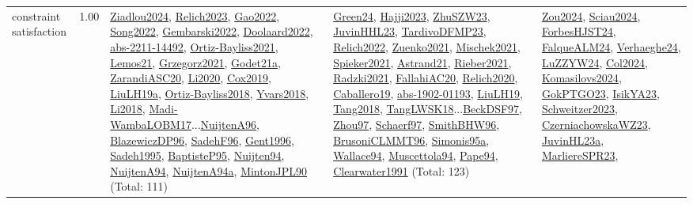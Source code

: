 {\begin{longtable}{p{3cm}r>{\raggedright\arraybackslash}p{6cm}>{\raggedright\arraybackslash}p{6cm}>{\raggedright\arraybackslash}p{8cm}}
\index{constraint satisfaction}\index{CP!constraint satisfaction}constraint satisfaction &  1.00 & \hyperref[detail:Ziadlou2024]{Ziadlou2024}, \hyperref[detail:Relich2023]{Relich2023}, \hyperref[detail:Gao2022]{Gao2022}, \hyperref[detail:Song2022]{Song2022}, \hyperref[detail:Gembarski2022]{Gembarski2022}, \hyperref[detail:Doolaard2022]{Doolaard2022}, \hyperref[detail:abs-2211-14492]{abs-2211-14492}, \hyperref[detail:Ortiz-Bayliss2021]{Ortiz-Bayliss2021}, \hyperref[detail:Lemos21]{Lemos21}, \hyperref[detail:Grzegorz2021]{Grzegorz2021}, \hyperref[detail:Godet21a]{Godet21a}, \hyperref[detail:ZarandiASC20]{ZarandiASC20}, \hyperref[detail:Li2020]{Li2020}, \hyperref[detail:Cox2019]{Cox2019}, \hyperref[detail:LiuLH19a]{LiuLH19a}, \hyperref[detail:Ortiz-Bayliss2018]{Ortiz-Bayliss2018}, \hyperref[detail:Yvars2018]{Yvars2018}, \hyperref[detail:Li2018]{Li2018}, \hyperref[detail:Madi-WambaLOBM17]{Madi-WambaLOBM17}...\hyperref[detail:NuijtenA96]{NuijtenA96}, \hyperref[detail:BlazewiczDP96]{BlazewiczDP96}, \hyperref[detail:SadehF96]{SadehF96}, \hyperref[detail:Gent1996]{Gent1996}, \hyperref[detail:Sadeh1995]{Sadeh1995}, \hyperref[detail:BaptisteP95]{BaptisteP95}, \hyperref[detail:Nuijten94]{Nuijten94}, \hyperref[detail:NuijtenA94]{NuijtenA94}, \hyperref[detail:NuijtenA94a]{NuijtenA94a}, \hyperref[detail:MintonJPL90]{MintonJPL90} (Total: 111) & \hyperref[detail:Green24]{Green24}, \hyperref[detail:Hajji2023]{Hajji2023}, \hyperref[detail:ZhuSZW23]{ZhuSZW23}, \hyperref[detail:JuvinHHL23]{JuvinHHL23}, \hyperref[detail:TardivoDFMP23]{TardivoDFMP23}, \hyperref[detail:Relich2022]{Relich2022}, \hyperref[detail:Zuenko2021]{Zuenko2021}, \hyperref[detail:Mischek2021]{Mischek2021}, \hyperref[detail:Spieker2021]{Spieker2021}, \hyperref[detail:Astrand21]{Astrand21}, \hyperref[detail:Rieber2021]{Rieber2021}, \hyperref[detail:Radzki2021]{Radzki2021}, \hyperref[detail:FallahiAC20]{FallahiAC20}, \hyperref[detail:Relich2020]{Relich2020}, \hyperref[detail:Caballero19]{Caballero19}, \hyperref[detail:abs-1902-01193]{abs-1902-01193}, \hyperref[detail:LiuLH19]{LiuLH19}, \hyperref[detail:Tang2018]{Tang2018}, \hyperref[detail:TangLWSK18]{TangLWSK18}...\hyperref[detail:BeckDSF97]{BeckDSF97}, \hyperref[detail:Zhou97]{Zhou97}, \hyperref[detail:Schaerf97]{Schaerf97}, \hyperref[detail:SmithBHW96]{SmithBHW96}, \hyperref[detail:BrusoniCLMMT96]{BrusoniCLMMT96}, \hyperref[detail:Simonis95a]{Simonis95a}, \hyperref[detail:Wallace94]{Wallace94}, \hyperref[detail:Muscettola94]{Muscettola94}, \hyperref[detail:Pape94]{Pape94}, \hyperref[detail:Clearwater1991]{Clearwater1991} (Total: 123) & \hyperref[detail:Zou2024]{Zou2024}, \hyperref[detail:Sciau2024]{Sciau2024}, \hyperref[detail:ForbesHJST24]{ForbesHJST24}, \hyperref[detail:FalqueALM24]{FalqueALM24}, \hyperref[detail:Verhaeghe24]{Verhaeghe24}, \hyperref[detail:LuZZYW24]{LuZZYW24}, \hyperref[detail:Col2024]{Col2024}, \hyperref[detail:Komasilovs2024]{Komasilovs2024}, \hyperref[detail:GokPTGO23]{GokPTGO23}, \hyperref[detail:IsikYA23]{IsikYA23}, \hyperref[detail:Schweitzer2023]{Schweitzer2023}, \hyperref[detail:CzerniachowskaWZ23]{CzerniachowskaWZ23}, \hyperref[detail:JuvinHL23a]{JuvinHL23a}, \hyperref[detail:MarliereSPR23]{MarliereSPR23}, 
\end{longtable}}
